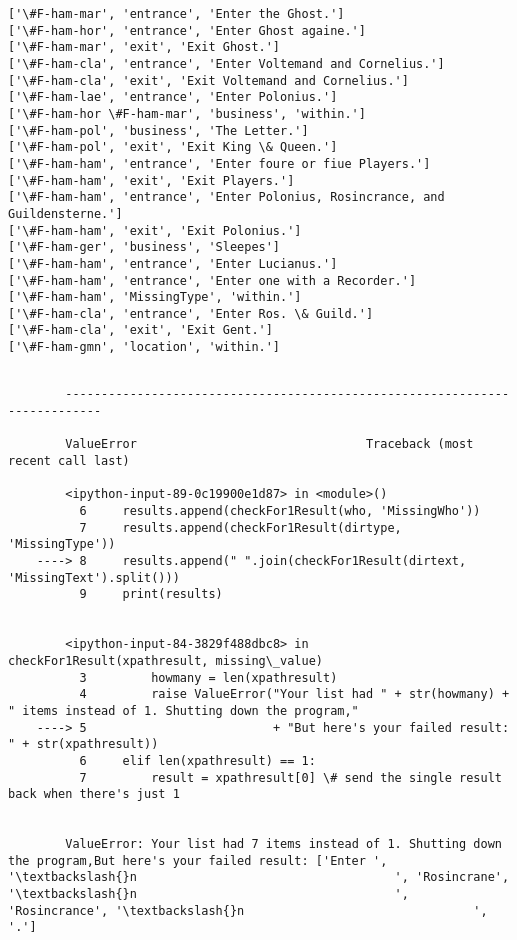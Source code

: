 \documentclass[11pt]{article}
\begin{document}
    \begin{Verbatim}[commandchars=\\\{\}]
['\#F-ham-mar', 'entrance', 'Enter the Ghost.']
['\#F-ham-hor', 'entrance', 'Enter Ghost againe.']
['\#F-ham-mar', 'exit', 'Exit Ghost.']
['\#F-ham-cla', 'entrance', 'Enter Voltemand and Cornelius.']
['\#F-ham-cla', 'exit', 'Exit Voltemand and Cornelius.']
['\#F-ham-lae', 'entrance', 'Enter Polonius.']
['\#F-ham-hor \#F-ham-mar', 'business', 'within.']
['\#F-ham-pol', 'business', 'The Letter.']
['\#F-ham-pol', 'exit', 'Exit King \& Queen.']
['\#F-ham-ham', 'entrance', 'Enter foure or fiue Players.']
['\#F-ham-ham', 'exit', 'Exit Players.']
['\#F-ham-ham', 'entrance', 'Enter Polonius, Rosincrance, and Guildensterne.']
['\#F-ham-ham', 'exit', 'Exit Polonius.']
['\#F-ham-ger', 'business', 'Sleepes']
['\#F-ham-ham', 'entrance', 'Enter Lucianus.']
['\#F-ham-ham', 'entrance', 'Enter one with a Recorder.']
['\#F-ham-ham', 'MissingType', 'within.']
['\#F-ham-cla', 'entrance', 'Enter Ros. \& Guild.']
['\#F-ham-cla', 'exit', 'Exit Gent.']
['\#F-ham-gmn', 'location', 'within.']

    \end{Verbatim}

    \begin{Verbatim}[commandchars=\\\{\}]

        ---------------------------------------------------------------------------

        ValueError                                Traceback (most recent call last)

        <ipython-input-89-0c19900e1d87> in <module>()
          6     results.append(checkFor1Result(who, 'MissingWho'))
          7     results.append(checkFor1Result(dirtype, 'MissingType'))
    ----> 8     results.append(" ".join(checkFor1Result(dirtext, 'MissingText').split()))
          9     print(results)
    

        <ipython-input-84-3829f488dbc8> in checkFor1Result(xpathresult, missing\_value)
          3         howmany = len(xpathresult)
          4         raise ValueError("Your list had " + str(howmany) + " items instead of 1. Shutting down the program,"
    ----> 5                          + "But here's your failed result: " + str(xpathresult))
          6     elif len(xpathresult) == 1:
          7         result = xpathresult[0] \# send the single result back when there's just 1
    

        ValueError: Your list had 7 items instead of 1. Shutting down the program,But here's your failed result: ['Enter ', '\textbackslash{}n                                    ', 'Rosincrane', '\textbackslash{}n                                    ', 'Rosincrance', '\textbackslash{}n                                ', '.']

    \end{Verbatim}
\end{document}
